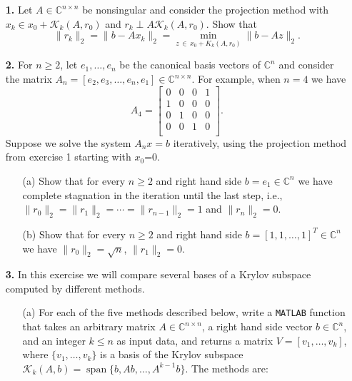 \documentclass[10pt]{report}
\begin{document}
\begin{enumerate}
\item[\textbf{1.}] Let $A \in \mathbb{C}^{n \times n}$ be nonsingular and consider the projection method with $x_k \in x_0 + \mathcal{K}_k(A,r_0)$ and \linebreak $r_k \perp A \mathcal{K}_k(A,r_0)$. Show that \[\|r_{k}\|_2=\|b-Ax_k\|_2=\min_{z \,\in \, x_0+K_k(A,r_0)}\|b-Az\|_2.\]

\vspace{0.1cm} 

\item[\textbf{2.}] For $n \geq 2$, let  $e_1, \ldots, e_n$ be the  canonical basis vectors of $\mathbb{C}^n$ and consider the matrix 
$A_n=[e_2,e_3,\ldots ,e_n,e_1] \in \mathbb{C}^{n \times n}$. For example, when $n=4$ we have
\[  A_4 = \left[\begin{array}{cccc}
0 & 0 & 0 & 1 \\ 
1 & 0 & 0 & 0 \\
0 & 1 & 0 & 0 \\
0 & 0 & 1 & 0 \\
\end{array} \right].\]
Suppose we  solve the system $A_nx=b$ iteratively, using the projection method from exercise 1 starting with $x_0$=0.
\begin{itemize}
\item[(a)] Show that for every $n \geq 2$ and right hand side $b=e_1 \in \mathbb{C}^n$ we have complete stagnation in the iteration until the last step, i.e., $\|r_0\|_2 = \|r_1\|_2=\cdots =\|r_{n-1}\|_2=1$ and $\|r_n\|_2=0$.
\item[(b)] Show that for every $n \geq 2$ and right hand side $b=[1, 1, \ldots, 1]^T \in \mathbb{C}^n$ we have $\|r_0\|_2=\sqrt{n}$, $\|r_1\|_2=0.$
\end{itemize}  

\item[\textbf{3.}] In this exercise we will compare several bases of a Krylov subspace computed by different methods.  

\begin{itemize}
\item[(a)]  For each of the five methods described below, write a \verb+MATLAB+ function that takes an arbitrary matrix $A \in \mathbb{C}^{n \times n}$, a right hand side vector $b\in \mathbb{C}^n$,  and an integer $k \leq n$ as input data, and returns a matrix $V=[v_1,\ldots,v_k]$, where $\{v_1, \ldots, v_k\}$ is a basis of the Krylov subspace $\mathcal{K}_k(A,b)= \operatorname{span}\{b, Ab, \ldots, A^{k-1}b\}.$ The methods are:


\end{itemize}
\end{enumerate}
\end{document}
